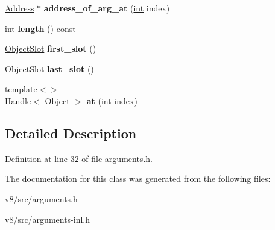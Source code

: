 \begin{DoxyCompactItemize}
\item 
\mbox{\label{classv8_1_1internal_1_1Arguments_a8e8adf2d479cbf1636f63bbf24037535}} 
\mbox{\hyperlink{classuintptr__t}{Address}} $\ast$ {\bfseries address\+\_\+of\+\_\+arg\+\_\+at} (\mbox{\hyperlink{classint}{int}} index)
\item 
\mbox{\label{classv8_1_1internal_1_1Arguments_aca0d27558d0fddd78eeda48ec8abfd42}} 
\mbox{\hyperlink{classint}{int}} {\bfseries length} () const
\item 
\mbox{\label{classv8_1_1internal_1_1Arguments_ab570c3546cb58c32563f03f7af580c37}} 
\mbox{\hyperlink{classv8_1_1internal_1_1ObjectSlot}{Object\+Slot}} {\bfseries first\+\_\+slot} ()
\item 
\mbox{\label{classv8_1_1internal_1_1Arguments_ae1849cbf2c441182450acb23f1fadef4}} 
\mbox{\hyperlink{classv8_1_1internal_1_1ObjectSlot}{Object\+Slot}} {\bfseries last\+\_\+slot} ()
\item 
\mbox{\label{classv8_1_1internal_1_1Arguments_ad5e78fde706fd1a7efb7973240292f41}} 
{\footnotesize template$<$$>$ }\\\mbox{\hyperlink{classv8_1_1internal_1_1Handle}{Handle}}$<$ \mbox{\hyperlink{classv8_1_1internal_1_1Object}{Object}} $>$ {\bfseries at} (\mbox{\hyperlink{classint}{int}} index)
\end{DoxyCompactItemize}


\subsection{Detailed Description}


Definition at line 32 of file arguments.\+h.



The documentation for this class was generated from the following files\+:\begin{DoxyCompactItemize}
\item 
v8/src/arguments.\+h\item 
v8/src/arguments-\/inl.\+h\end{DoxyCompactItemize}

